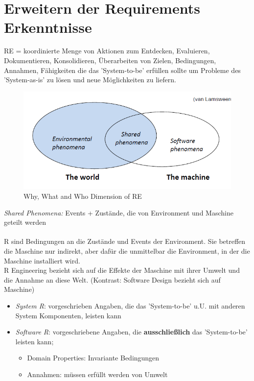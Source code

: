 \section{Erweitern der Requirements Erkenntnisse}
RE = koordinierte Menge von Aktionen zum Entdecken, Evaluieren, Dokumentieren, Konsolidieren, Überarbeiten von Zielen, Bedingungen, Annahmen, Fähigkeiten die das 'System-to-be' erfüllen sollte um Probleme des 'System-as-is' zu lösen und neue Möglichkeiten zu liefern.

\begin{figure}[h]
	\centering
	\includegraphics[scale=0.5]{img/re_world.png}
	\caption{Why, What and Who Dimension of RE}
	\label{re_world}
\end{figure}

\textit{Shared Phenomena:} Events + Zustände, die von Environment und Maschine geteilt werden\\
\\
R sind Bedingungen an die Zustände und Events der Environment. Sie betreffen die Maschine nur indirekt, aber dafür die unmittelbar die Environment, in der die Maschine installiert wird.\\
R Engineering bezieht sich auf die Effekte der Maschine mit ihrer Umwelt und die Annahme an diese Welt. (Kontrast: Software Design bezieht sich auf Maschine)
\begin{itemize}
	\item \textit{System R}: vorgeschrieben Angaben, die das 'System-to-be' u.U. mit anderen System Komponenten, leisten kann
	\item \textit{Software R}: vorgeschriebene Angaben, die \textbf{ausschließlich} das 'System-to-be' leisten kann;
	\begin{itemize}
		\item Domain Properties: Invariante Bedingungen 
		\item Annahmen: müssen erfüllt werden von Umwelt
	\end{itemize}
\end{itemize}

